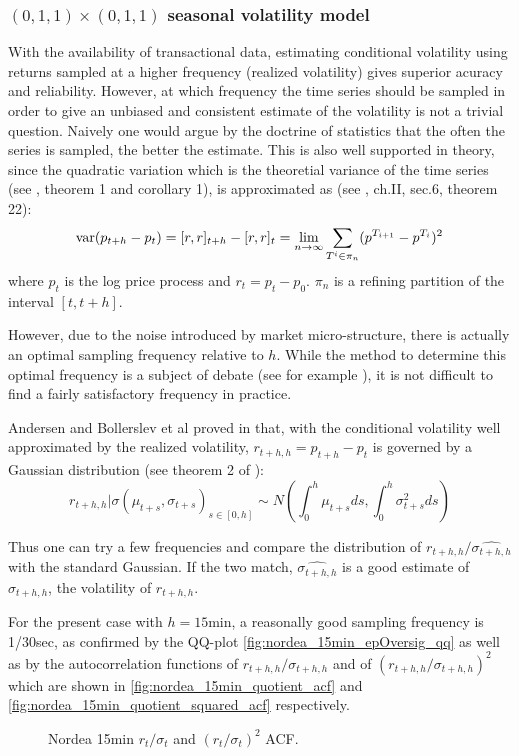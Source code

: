 \documentclass{book}
\begin{document}
\subsubsection{$(0,1,1)\times(0, 1, 1)$ seasonal volatility model}
With the availability of transactional data, estimating conditional
volatility using returns sampled at a higher frequency (realized
volatility) gives superior acuracy and reliability. However, at which
frequency the time series should be sampled in order to give an
unbiased and consistent estimate of the volatility is not a trivial
question. Naively one would argue by the doctrine of statistics that
the often the series is sampled, the better the estimate. This is also
well supported in theory, since the quadratic variation which is the
theoretial variance of the time series (see \cite{Andersen03}, theorem
1 and corollary 1), is approximated as (see \cite{Protter05}, ch.II,
sec.6, theorem 22):
\[
\text{var}(p_{t+h} - p_t) = [r, r]_{t+h} - [r, r]_t = \lim_{n \to \infty}
\sum_{T^i \in \pi_n} (p^{T_{i+1}} - p^{T_i})^2
\]
where $p_t$ is the log price process and $r_t = p_t - p_0$. $\pi_n$
is a refining partition of the interval $[t, t+h]$.

However, due to the noise introduced by market micro-structure, there
is actually an optimal sampling frequency relative to $h$. While the
method to determine this optimal frequency is a subject of debate (see
for example \cite{Sahalia05}), it is not difficult to find a fairly
satisfactory frequency in practice.

Andersen and Bollerslev et al proved in \cite{Andersen03} that, with
the conditional volatility well approximated by the realized
volatility, $r_{t+h, h} = p_{t+h} - p_t$ is governed by a Gaussian
distribution (see theorem 2 of \cite{Andersen03}):
\[
r_{t+h, h} | \sigma(\mu_{t+s}, \sigma_{t+s})_{s \in [0, h]} \sim
N(\int_{0}^h \mu_{t+s} ds, \int_{0}^h \sigma_{t+s}^2 ds)
\]

Thus one can try a few frequencies and compare the distribution of
$r_{t+h, h}/\hat{\sigma_{t+h, h}}$ with the standard Gaussian. If the
two match, $\hat{\sigma_{t+h, h}}$ is a good estimate of $\sigma_{t+h,
  h}$, the volatility of $r_{t+h, h}$.

For the present case with $h = 15\text{min}$, a reasonally good
sampling frequency is 1/30sec, as confirmed by the QQ-plot
\ref{fig:nordea_15min_epOversig_qq} as well as by the autocorrelation
functions of $r_{t+h, h} / \sigma_{t+h, h}$ and of $(r_{t+h, h} /
\sigma_{t+h, h})^2$ which are shown in
\ref{fig:nordea_15min_quotient_acf} and
\ref{fig:nordea_15min_quotient_squared_acf} respectively.
\begin{figure}[htb!]
  \centering
  \caption{\footnotesize Nordea 15min $r_t/\sigma_t$ and $(r_t/\sigma_t)^2$ ACF.}
\end{figure}
\end{document}
